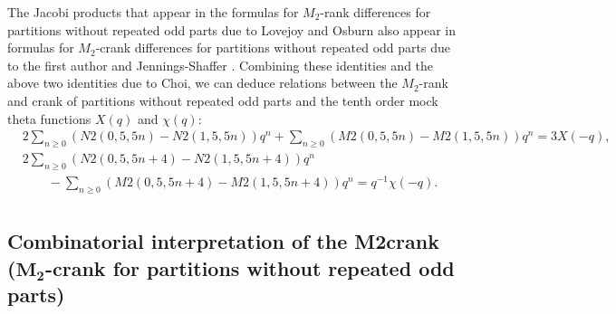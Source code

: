\documentclass[pdftex]{sigma}
\numberwithin{equation}{section}
\begin{document}
The Jacobi products that appear in the formulas for $M_2$-rank differences for partitions without repeated odd parts due to Lovejoy and Osburn \cite[Theorem~1.2]{Lo-Os09} also appear in formulas for $M_2$-crank differences for partitions without repeated odd parts due to the first author and Jennings-Shaffer \cite[Theorem 2.12]{Ga-Sh}. Combining these identities and the above two identities due to Choi, we can deduce relations between the $M_2$-rank and crank of partitions without repeated odd parts and the tenth order mock theta functions $X(q)$ and $\chi(q)$:
\begin{align*}
&{}2\sum_{n\geq 0}(N2(0,5,5n)-N2(1,5,5n))q^n+\sum_{n\geq 0}(M2(0,5,5n)-M2(1,5,5n))q^n=3X(-q),
\\
&{}2\sum_{n\geq 0}(N2(0,5,5n+4)-N2(1,5,5n+4))q^n
\\
&\qquad{}-\sum_{n\geq 0}(M2(0,5,5n+4)-M2(1,5,5n+4))q^n=q^{-1}\chi(-q).\\
\end{align*}


\subsection[Combinatorial interpretation of the M2crank (M\_2-crank for partitions without repeated odd parts)]{Combinatorial interpretation of the M2crank \\($\boldsymbol{M_2}$-crank for partitions without repeated odd parts)}
\end{document}
